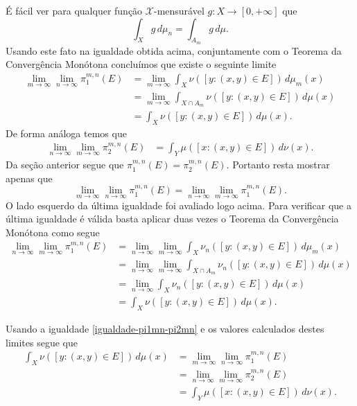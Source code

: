 É fácil ver para qualquer função $\mathscr{X}$-mensurável $g:X\to [0,+\infty]$ que 
\[
\int_X g \,d\mu_n = \int_{A_m} g\, d\mu.
\]
Usando este fato na igualdade obtida acima, conjuntamente 
com o Teorema da Convergência Monótona concluímos que
existe o seguinte limite 
\begin{align*}
\lim_{m\to\infty} \lim_{n\to\infty}\pi_1^{m,n}(E)
&=
\lim_{m\to\infty}\int_X \nu([y:(x,y)\in E ])\, d\mu_m(x)
\\
&=
\lim_{m\to\infty}\int_{X\cap A_m} \nu([y:(x,y)\in E ])\, d\mu(x)
\\
&=
\int_{X} \nu([y:(x,y)\in E ])\, d\mu(x).
\end{align*}
De forma análoga temos que 
\begin{align*}
\lim_{n\to\infty} \lim_{m\to\infty}\pi_2^{m,n}(E)
&=
\int_{Y} \mu([x:(x,y)\in E ])\, d\nu(x).
\end{align*}
Da seção anterior segue que $\pi_1^{m,n}(E)= \pi_2^{m,n}(E)$. Portanto
resta mostrar apenas que 
\begin{equation}\label{igualdade-pi1mn-pi2mn}
\lim_{m\to\infty}\lim_{n\to\infty} \pi_1^{m,n}(E)
=
\lim_{n\to\infty}\lim_{m\to\infty} \pi_1^{m,n}(E).
\end{equation}
O lado esquerdo da última igualdade foi avaliado logo acima. 
Para verificar que a última igualdade é válida basta aplicar duas vezes o
Teorema da Convergência Monótona como segue
\begin{align*}
\lim_{n\to\infty}\lim_{m\to\infty} \pi_1^{m,n}(E)
&=
\lim_{n\to\infty}\lim_{m\to\infty}
\int_X \nu_n([y:(x,y)\in E ])\, d\mu_m(x)
\\
&=
\lim_{n\to\infty}\lim_{m\to\infty}
\int_{X\cap A_m} \nu_n([y:(x,y)\in E ])\, d\mu(x)
\\
&=
\lim_{n\to\infty}
\int_{X} \nu_n([y:(x,y)\in E ])\, d\mu(x)
\\
&=
\int_{X} \nu([y:(x,y)\in E ])\, d\mu(x).
\end{align*} 

Usando a igualdade \eqref{igualdade-pi1mn-pi2mn} e os valores 
calculados destes limites segue que 
\begin{align*}
\int_{X} \nu([y:(x,y)\in E ])\, d\mu(x)
&=
\lim_{m\to\infty} \lim_{n\to\infty}\pi_1^{m,n}(E)
\\
&=
\lim_{n\to\infty} \lim_{m\to\infty}\pi_2^{m,n}(E)
\\
&=
\int_{Y} \mu([x:(x,y)\in E ])\, d\nu(x).
\end{align*}









